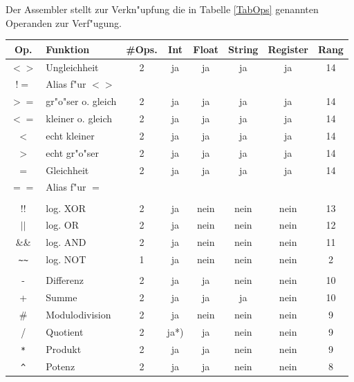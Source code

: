 \documentclass[12pt,a4paper,twoside]{report}
\begin{document}
Der Assembler stellt zur Verkn"upfung die in Tabelle \ref{TabOps} genannten
Operanden zur Verf"ugung.
\begin{table}[htbp]
\begin{center}\begin{tabular}{|c|l|c|c|c|c|c|c|}
\hline
Op. & Funktion & \#Ops. & Int & Float & String & Register & Rang \\
\hline
\hline
$<>$        & Ungleichheit         & 2 & ja   & ja   & ja   & ja   & 14 \\
$!=$        & Alias f"ur $<>$      &   &      &      &      &      &    \\
$>=$        & gr"o"ser o. gleich   & 2 & ja   & ja   & ja   & ja   & 14 \\
$<=$        & kleiner o. gleich    & 2 & ja   & ja   & ja   & ja   & 14 \\
$<$         & echt kleiner         & 2 & ja   & ja   & ja   & ja   & 14 \\
$>$         & echt gr"o"ser        & 2 & ja   & ja   & ja   & ja   & 14 \\
$=$         & Gleichheit           & 2 & ja   & ja   & ja   & ja   & 14 \\
$==$        & Alias f"ur $=$       &   &      &      &      &      &    \\
            & & & & & &  \\
$!!$        & log. XOR             & 2 & ja   & nein & nein & nein & 13 \\
$||$        & log. OR              & 2 & ja   & nein & nein & nein & 12 \\
\&\&        & log. AND             & 2 & ja   & nein & nein & nein & 11 \\
\verb! ~~ ! & log. NOT             & 1 & ja   & nein & nein & nein & 2 \\
            & & & & & &  \\
-           & Differenz            & 2 & ja   & ja   & nein & nein & 10 \\
+           & Summe                & 2 & ja   & ja   & ja   & nein & 10 \\
\#          & Modulodivision       & 2 & ja   & nein & nein & nein & 9 \\
/           & Quotient             & 2 & ja*) & ja   & nein & nein & 9 \\
\verb! * !  & Produkt              & 2 & ja   & ja   & nein & nein & 9 \\
\verb! ^ !  & Potenz               & 2 & ja   & ja   & nein & nein & 8 \\

\end{tabular}
\end{center}
\end{table}
\end{document}
